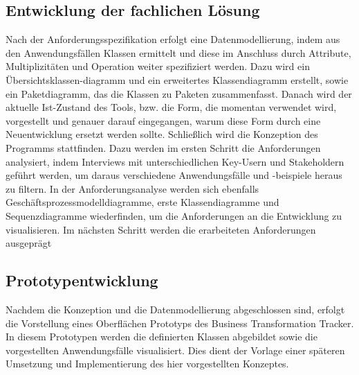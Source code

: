\subsection{Entwicklung der fachlichen Lösung}
Nach der Anforderungsspezifikation erfolgt eine Datenmodellierung, indem aus den Anwendungsfällen Klassen ermittelt und diese im Anschluss durch Attribute, Multiplizitäten und Operation weiter spezifiziert werden. Dazu wird ein Übersichtsklassen-diagramm und ein erweitertes Klassendiagramm erstellt, sowie ein Paketdiagramm, das die Klassen zu Paketen zusammenfasst.  Danach wird der aktuelle Ist-Zustand des Tools, bzw. die Form, die momentan verwendet wird, vorgestellt und genauer darauf eingegangen, warum diese Form durch eine Neuentwicklung ersetzt werden sollte. Schließlich wird die Konzeption des Programms stattfinden. Dazu werden im ersten Schritt die Anforderungen analysiert, indem Interviews mit unterschiedlichen Key-Usern und Stakeholdern geführt werden, um daraus verschiedene Anwendungsfälle und -beispiele heraus zu filtern. In der Anforderungsanalyse werden sich ebenfalls Geschäftsprozessmodelldiagramme, erste Klassendiagramme und Sequenzdiagramme wiederfinden, um die Anforderungen an die Entwicklung zu visualisieren. Im nächsten Schritt werden die erarbeiteten Anforderungen ausgeprägt

\subsection{Prototypentwicklung}
Nachdem die Konzeption und die Datenmodellierung abgeschlossen sind, erfolgt die Vorstellung eines Oberflächen Prototyps des Business Transformation Tracker. In diesem Prototypen werden die definierten Klassen abgebildet sowie die vorgestellten Anwendungsfälle visualisiert. Dies dient der Vorlage einer späteren Umsetzung und Implementierung des hier vorgestellten Konzeptes. 